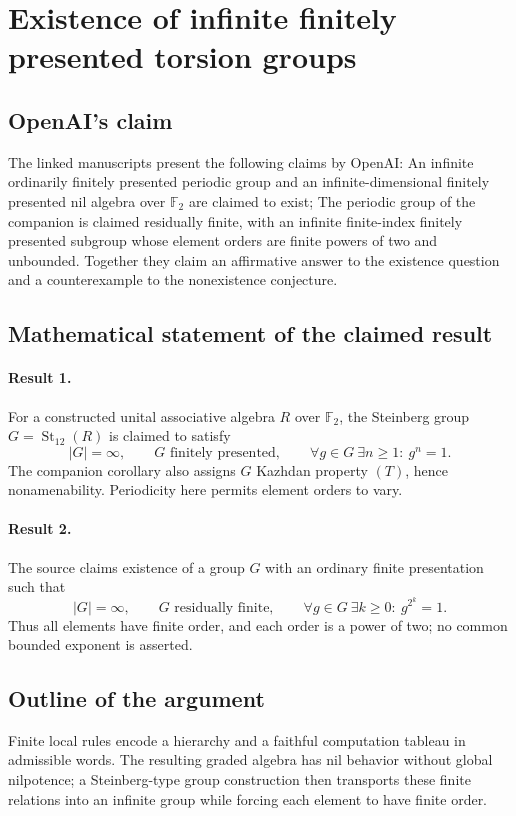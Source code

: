\documentclass[11pt]{article}
\begin{document}
\section*{Existence of infinite finitely presented torsion groups}

\subsection{OpenAI's claim}
The linked manuscripts present the following claims by OpenAI: An infinite ordinarily finitely presented periodic group and an infinite-dimensional finitely presented nil algebra over $\mathbb F_2$ are claimed to exist; The periodic group of the companion is claimed residually finite, with an infinite finite-index finitely presented subgroup whose element orders are finite powers of two and unbounded. Together they claim an affirmative answer to the existence question and a counterexample to the nonexistence conjecture.

\subsection{Mathematical statement of the claimed result}
\paragraph{Result 1.} For a constructed unital associative algebra \(R\) over \(\mathbb F_2\), the Steinberg group \(G=\operatorname{St}_{12}(R)\) is claimed to satisfy
\[
 |G|=\infty,\qquad G\text{ finitely presented},\qquad
 \forall g\in G\ \exists n\ge1:\ g^n=1.
\]
The companion corollary also assigns \(G\) Kazhdan property \((T)\), hence nonamenability. Periodicity here permits element orders to vary.

\paragraph{Result 2.} The source claims existence of a group \(G\) with an ordinary finite presentation such that
\[
 |G|=\infty,\qquad G\text{ residually finite},\qquad
 \forall g\in G\ \exists k\ge0:\ g^{2^k}=1.
\]
Thus all elements have finite order, and each order is a power of two; no common bounded exponent is asserted.

\subsection{Outline of the argument}
Finite local rules encode a hierarchy and a faithful computation tableau in admissible words. The resulting graded algebra has nil behavior without global nilpotence; a Steinberg-type group construction then transports these finite relations into an infinite group while forcing each element to have finite order.
\end{document}
